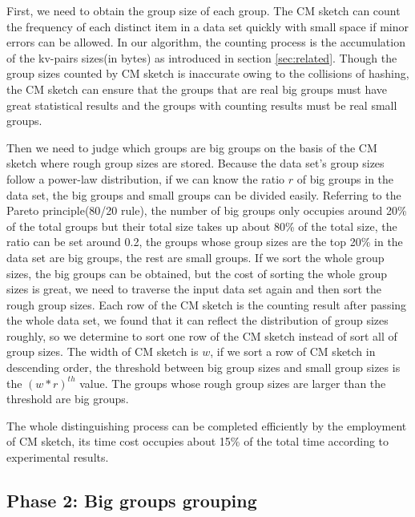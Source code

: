 First, we need to obtain the group size of each group. The CM sketch can count the frequency of each distinct item in a data set quickly with small space if minor errors can be allowed. In our algorithm, the counting process is the accumulation of the kv-pairs sizes(in bytes) as introduced in section \ref{sec:related}. Though the group sizes counted by CM sketch is inaccurate owing to the collisions of hashing, the CM sketch can ensure that the groups that are real big groups must have great statistical results and the groups with counting results must be real small groups.   

Then we need to judge which groups are big groups on the basis of the CM sketch where rough group sizes are stored. Because the data set's group sizes follow a power-law distribution, if we can know the ratio $r$ of big groups in the data set, the big groups and small groups can be divided easily. Referring to the Pareto principle(80/20 rule), the number of big groups only occupies around 20\% of the total groups but their total size takes up about 80\% of the total size, the ratio can be set around 0.2, the groups whose group sizes are the top 20\% in the data set are big groups, the rest are small groups. If we sort the whole group sizes, the big groups can be obtained, but the cost of sorting the whole group sizes is great, we need to traverse the input data set again and then sort the rough group sizes. Each row of the CM sketch is the counting result after passing the whole data set, we found that it can reflect the distribution of group sizes roughly, so we determine to sort one row of the CM sketch instead of sort all of group sizes. The width of CM sketch is $w$, if we sort a row of CM sketch in descending order, the threshold between big group sizes and small group sizes is the ${(w*r)}^{th}$ value. The groups whose rough group sizes are larger than the threshold are big groups. 

The whole distinguishing process can be completed efficiently by the employment of CM sketch, its time cost occupies about 15\% of the total time according to experimental results.

\subsection{Phase 2: Big groups grouping} 


